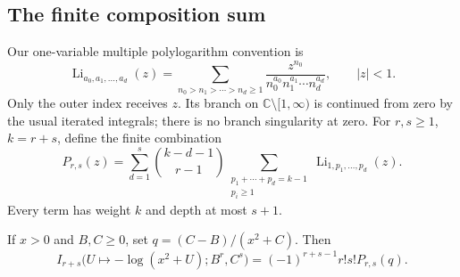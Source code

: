 \subsection{The finite composition sum}

Our one-variable multiple polylogarithm convention is
\begin{equation}\label{tc:eq:MPL}
 \operatorname{Li}_{a_0,a_1,\ldots,a_d}(z)
  =\sum_{n_0>n_1>\cdots>n_d\ge1}
      \frac{z^{n_0}}{n_0^{a_0}n_1^{a_1}\cdots n_d^{a_d}},
 \qquad |z|<1.
\end{equation}
Only the outer index receives $z$.  Its branch on
$\mathbb C\setminus[1,\infty)$ is continued from zero by the
usual iterated integrals; there is no branch singularity at zero.
For $r,s\ge1$, $k=r+s$, define the finite combination
\begin{equation}\label{tc:eq:P}
 \boxed{\displaystyle
 P_{r,s}(z)=\sum_{d=1}^{s}\binom{k-d-1}{r-1}
      \sum_{\substack{p_1+\cdots+p_d=k-1\\p_i\ge1}}
                \operatorname{Li}_{1,p_1,\ldots,p_d}(z).}
\end{equation}
Every term has weight $k$ and depth at most $s+1$.

\begin{lemma}
\label{tc:lem:logarithm}
If $x>0$ and $B,C\ge0$, set
$q=(C-B)/(x^2+C)$.  Then
\begin{equation}\label{tc:eq:logarithmic-face}
 I_{r+s}\bigl(U\mapsto-\log(x^2+U);B^r,C^s\bigr)
     =(-1)^{r+s-1}r!s!P_{r,s}(q).
\end{equation}
\end{lemma}

